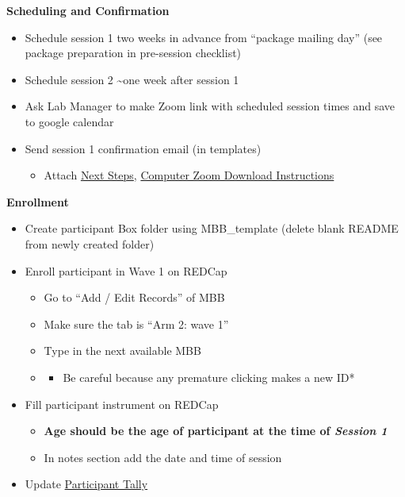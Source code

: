 \documentclass[
]{book}
\providecommand{\tightlist}{%
  \setlength{\itemsep}{0pt}\setlength{\parskip}{0pt}}
\begin{document}
\textbf{Scheduling and Confirmation}

\begin{itemize}
\tightlist
\item
  Schedule session 1 two weeks in advance from ``package mailing day'' (see package preparation in pre-session checklist)
\item
  Schedule session 2 \textasciitilde one week after session 1
\item
  Ask Lab Manager to make Zoom link with scheduled session times and save to google calendar
\item
  Send session 1 confirmation email (in templates)

  \begin{itemize}
  \tightlist
  \item
    Attach \href{https://ucla.app.box.com/file/665452959932}{Next Steps}, \href{https://ucla.app.box.com/file/680632734387}{Computer Zoom Download Instructions}
  \end{itemize}
\end{itemize}

\textbf{Enrollment}

\begin{itemize}
\tightlist
\item
  Create participant Box folder using MBB\_template (delete blank README from newly created folder)
\item
  Enroll participant in Wave 1 on REDCap

  \begin{itemize}
  \item
    Go to ``Add / Edit Records'' of MBB
  \item
    Make sure the tab is ``Arm 2: wave 1''
  \item
    Type in the next available MBB
  \item
    \begin{itemize}
    \tightlist
    \item
      Be careful because any premature clicking makes a new ID*
    \end{itemize}
  \end{itemize}
\item
  Fill participant instrument on REDCap

  \begin{itemize}
  \tightlist
  \item
    \textbf{Age should be the age of participant at the time of \emph{Session 1} }
  \item
    In notes section add the date and time of session
  \end{itemize}
\item
  Update \href{https://ucla.app.box.com/file/724688028024}{Participant Tally}
\end{itemize}
\end{document}
